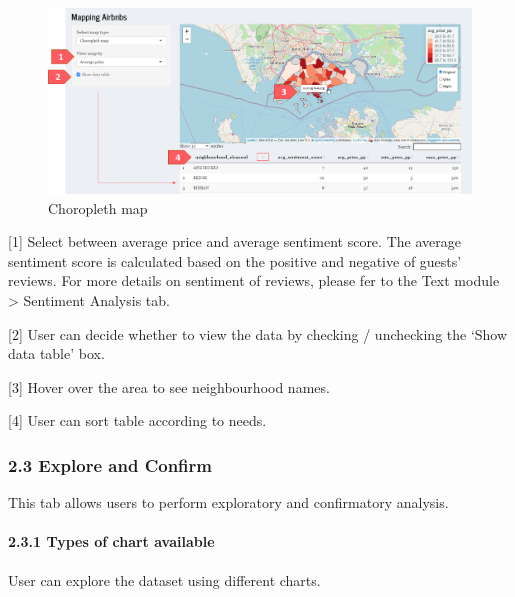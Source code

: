 \documentclass[
  12pt,
]{article}
\begin{document}
\begin{figure}[H]

{\centering \includegraphics[width=1\linewidth]{images/choro} 

}

\caption{Choropleth map}\label{fig:unnamed-chunk-6}
\end{figure}

{[}1{]} Select between average price and average sentiment score. The
average sentiment score is calculated based on the positive and negative
of guests' reviews. For more details on sentiment of reviews, please fer
to the Text module \textgreater{} Sentiment Analysis tab.

{[}2{]} User can decide whether to view the data by checking /
unchecking the `Show data table' box.

{[}3{]} Hover over the area to see neighbourhood names.

{[}4{]} User can sort table according to needs.

\hypertarget{explore-and-confirm}{%
\subsubsection{2.3 Explore and Confirm}\label{explore-and-confirm}}

This tab allows users to perform exploratory and confirmatory analysis.

\hypertarget{types-of-chart-available}{%
\paragraph{2.3.1 Types of chart
available}\label{types-of-chart-available}}

User can explore the dataset using different charts.
\end{document}
